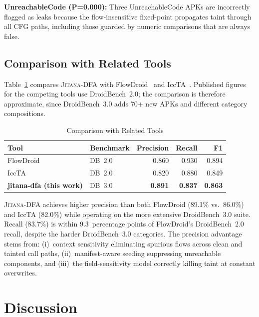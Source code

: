 \documentclass[conference]{IEEEtran}
\begin{document}
\textbf{UnreachableCode (P=0.000):} Three UnreachableCode APKs are incorrectly
flagged as leaks because the flow-insensitive fixed-point propagates taint
through all CFG paths, including those guarded by numeric comparisons that are
always false.

\subsection{Comparison with Related Tools}

Table~\ref{tab:comparison} compares \textsc{Jitana-DFA} with FlowDroid~\cite{flowdroid}
and IccTA~\cite{iccta}. Published figures for the competing tools use
DroidBench~2.0; the comparison is therefore approximate, since DroidBench~3.0
adds 70+ new APKs and different category compositions.

\begin{table}[t]
\caption{Comparison with Related Tools}
\label{tab:comparison}
\centering
\begin{tabular}{llrrr}
\toprule
Tool & Benchmark & Precision & Recall & F1 \\
\midrule
FlowDroid~\cite{flowdroid}       & DB~2.0 & 0.860 & 0.930 & 0.894 \\
IccTA~\cite{iccta}               & DB~2.0 & 0.820 & 0.880 & 0.849 \\
\textbf{jitana-dfa (this work)}  & DB~3.0 & \textbf{0.891} & \textbf{0.837} & \textbf{0.863} \\
\bottomrule
\end{tabular}
\end{table}

\textsc{Jitana-DFA} achieves higher precision than both FlowDroid (89.1\%
vs.~86.0\%) and IccTA (82.0\%) while operating on the more extensive
DroidBench~3.0 suite. Recall (83.7\%) is within 9.3~percentage points of
FlowDroid's DroidBench~2.0 recall, despite the harder DroidBench~3.0 categories.
The precision advantage stems from: (i)~context sensitivity eliminating spurious
flows across clean and tainted call paths, (ii)~manifest-aware seeding
suppressing unreachable components, and (iii)~the field-sensitivity model
correctly killing taint at constant overwrites.

\section{Discussion}
\end{document}
